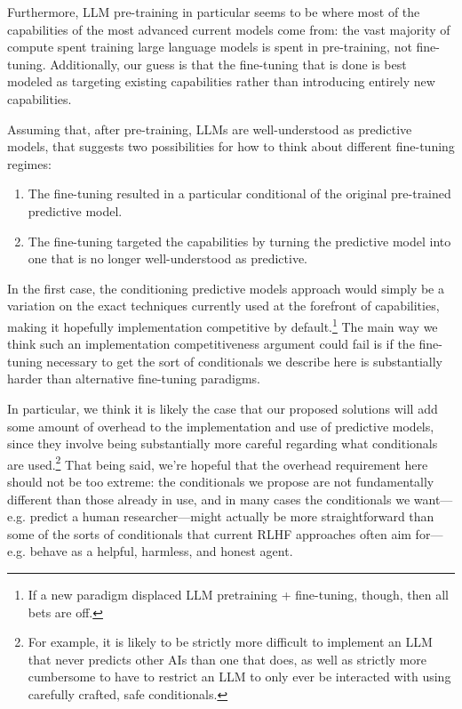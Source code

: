 \documentclass[
  onecolumn,
  natbib,
]{miri-tech-article}
\begin{document}
Furthermore, LLM pre-training in particular seems to be where most of the capabilities of the most advanced current models come from: the vast majority of compute spent training large language models is spent in pre-training, not fine-tuning. Additionally, our guess is that the fine-tuning that is done is best modeled as targeting existing capabilities rather than introducing entirely new capabilities.

Assuming that, after pre-training, LLMs are well-understood as predictive models, that suggests two possibilities for how to think about different fine-tuning regimes:



\begin{enumerate}
\item The fine-tuning resulted in a particular conditional of the original pre-trained predictive model.
\item The fine-tuning targeted the capabilities by turning the predictive model into one that is no longer well-understood as predictive.
\end{enumerate}

In the first case, the conditioning predictive models approach would simply be a variation on the exact techniques currently used at the forefront of capabilities, making it hopefully implementation competitive by default.\footnote{If a new paradigm displaced LLM pretraining + fine-tuning, though, then all bets are off.} The main way we think such an implementation competitiveness argument could fail is if the fine-tuning necessary to get the sort of conditionals we describe here is substantially harder than alternative fine-tuning paradigms.

In particular, we think it is likely the case that our proposed solutions will add some amount of overhead to the implementation and use of predictive models, since they involve being substantially more careful regarding what conditionals are used.\footnote{For example, it is likely to be strictly more difficult to implement an LLM that never predicts other AIs than one that does, as well as strictly more cumbersome to have to restrict an LLM to only ever be interacted with using carefully crafted, safe conditionals.} That being said, we're hopeful that the overhead requirement here should not be too extreme: the conditionals we propose are not fundamentally different than those already in use, and in many cases the conditionals we want---e.g. predict a human researcher---might actually be more straightforward than some of the sorts of conditionals that current RLHF approaches often aim for---e.g. behave as a helpful, harmless, and honest agent\cite{bai_training_2022}.
\end{document}
